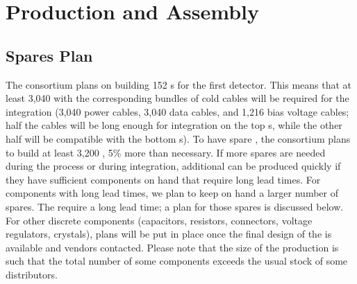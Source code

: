 \section{Production and Assembly}
\label{sec:fdsp-tpcelec-production}



\subsection{Spares Plan}
\label{sec:fdsp-tpcelec-production-spares}

The  consortium plans on building 152 s
for the first  detector. This means that at least
3,040  with the corresponding bundles of cold
cables will be required for the integration (3,040 power cables, 3,040 data cables, and 1,216 bias voltage
cables; half the cables will be long enough for 
integration on the top s, while the other half will
be compatible with the bottom s). To have spare , the  consortium plans to
build at least 3,200 , 5\% more than necessary. If more spares are needed during the
 process or during integration, additional 
 can be produced quickly if they have sufficient components on hand that require long lead times.
For components with long lead times, we plan to keep on hand a
larger number of spares. The  require a long lead time; a plan for those spares is
discussed below. For other discrete components
(capacitors, resistors, connectors, voltage regulators, crystals),
plans will be put in place once the final design of the 
is available and vendors contacted. Please note that the
size of the  production is such that the total number
of some components exceeds the usual stock of some distributors.

